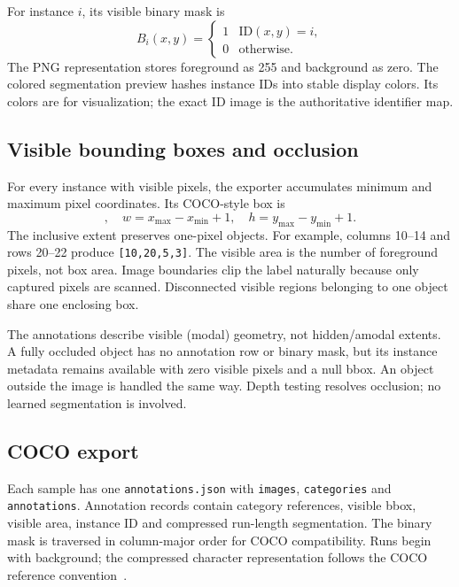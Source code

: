 \documentclass[12pt,a4paper]{article}
\newcommand{\code}[1]{{\small\nolinkurl{#1}}}
\begin{document}
For instance $i$, its visible binary mask is
\begin{equation}
B_i(x,y)=\begin{cases}1&\mathrm{ID}(x,y)=i,\\0&\text{otherwise}.\end{cases}
\end{equation}
The PNG representation stores foreground as 255 and background as zero. The colored segmentation preview hashes instance IDs into stable display colors. Its colors are for visualization; the exact ID image is the authoritative identifier map.

\subsection{Visible bounding boxes and occlusion}
For every instance with visible pixels, the exporter accumulates minimum and maximum pixel coordinates. Its COCO-style box is
\begin{equation}
[x_{\min},y_{\min},w,h],\quad
w=x_{\max}-x_{\min}+1,\quad h=y_{\max}-y_{\min}+1.
\end{equation}
The inclusive extent preserves one-pixel objects. For example, columns 10--14 and rows 20--22 produce \code{[10,20,5,3]}. The visible area is the number of foreground pixels, not box area. Image boundaries clip the label naturally because only captured pixels are scanned. Disconnected visible regions belonging to one object share one enclosing box.

The annotations describe visible (modal) geometry, not hidden/amodal extents. A fully occluded object has no annotation row or binary mask, but its instance metadata remains available with zero visible pixels and a null bbox. An object outside the image is handled the same way. Depth testing resolves occlusion; no learned segmentation is involved.

\subsection{COCO export}
Each sample has one \code{annotations.json} with \code{images}, \code{categories} and \code{annotations}. Annotation records contain category references, visible bbox, visible area, instance ID and compressed run-length segmentation. The binary mask is traversed in column-major order for COCO compatibility. Runs begin with background; the compressed character representation follows the COCO reference convention~\cite{coco}.
\end{document}
